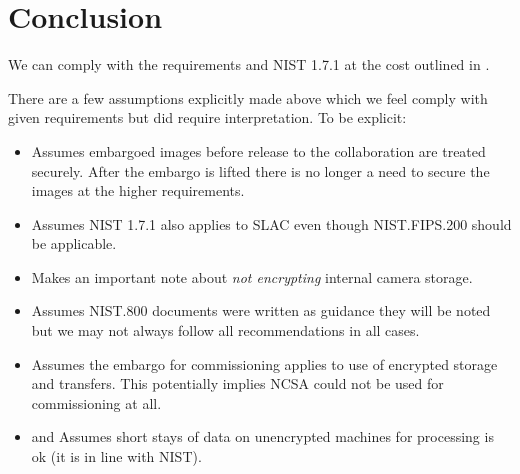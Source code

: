 \section{Conclusion}\label{sec:conc}
We can comply with the requirements and NIST 1.7.1 at the cost outlined in .

There are a few assumptions explicitly made above which we feel comply with given requirements but did require interpretation. To be explicit:
\begin{itemize}
\item {} Assumes embargoed images before release to the collaboration are treated securely. After the embargo is lifted there is no longer a need to secure the images at the higher requirements.
\item {} Assumes NIST 1.7.1 also applies to SLAC even though NIST.FIPS.200 should be applicable.
\item {} Makes an important note about \emph{not encrypting} internal camera storage.
\item {} Assumes NIST.800 documents were written as guidance  they will be noted but we may not always follow all recommendations in all cases.
\item {} Assumes the embargo for commissioning applies to use of encrypted storage and transfers. This potentially implies NCSA could not be used for commissioning at all.
\item {} and  Assumes short stays of data on unencrypted machines for processing is ok (it is in line with NIST).

\end{itemize}
